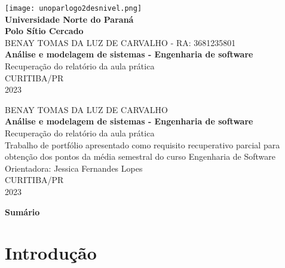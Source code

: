 \documentclass[12pt, a4paper]{article}
\begin{document}
\thispagestyle{empty}

\begin{center}
\texttt{[image: unoparlogo2desnivel.png]} \\
{\LARGE
\textbf{Universidade Norte do Paraná} \\
\textbf{Polo Sítio Cercado}\\
}\vspace{3cm}
{\Large
BENAY TOMAS DA LUZ DE CARVALHO - RA: 3681235801\\
\vspace{4cm}
\textbf{Análise e modelagem de sistemas - Engenharia de software}\\
Recuperação do relatório da aula prática\\
\vspace{9cm}
CURITIBA/PR\\
2023
}
\end{center}

\newpage
\thispagestyle{empty}
\begin{center}
{\Large
BENAY TOMAS DA LUZ DE CARVALHO\\
\vspace{5cm}
\textbf{Análise e modelagem de sistemas - Engenharia de software}\\
Recuperação do relatório da aula prática\\
\vspace{3cm}
\hspace*{3.3cm}Trabalho de portfólio apresentado como requisito
\hspace*{3.3cm}recuperativo parcial para obtenção dos pontos da
\hspace*{3.6cm}média semestral do curso Engenharia de Software\\
\hspace*{6.5cm}Orientadora: Jessica Fernandes Lopes\\
\vspace{9cm}
CURITIBA/PR\\
2023
}

\end{center}

\newpage
\begin{center}
{\Large
   \textbf{Sumário}
}
\end{center}

\renewcommand{\contentsname}{}
\tableofcontents


\newpage
\section{Introdução}
\end{document}
